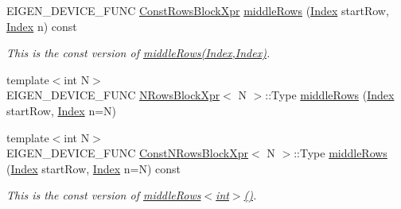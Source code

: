 \begin{DoxyCompactItemize}
\mbox{\label{class_eigen_1_1_sparse_matrix_base_a764c62621c13c3c0334a39f82d46a1fb}} 
E\+I\+G\+E\+N\+\_\+\+D\+E\+V\+I\+C\+E\+\_\+\+F\+U\+NC \mbox{\hyperlink{class_eigen_1_1_block}{Const\+Rows\+Block\+Xpr}} \mbox{\hyperlink{class_eigen_1_1_sparse_matrix_base_a764c62621c13c3c0334a39f82d46a1fb}{middle\+Rows}} (\mbox{\hyperlink{struct_eigen_1_1_eigen_base_a554f30542cc2316add4b1ea0a492ff02}{Index}} start\+Row, \mbox{\hyperlink{struct_eigen_1_1_eigen_base_a554f30542cc2316add4b1ea0a492ff02}{Index}} n) const
\begin{DoxyCompactList}\small\item\em This is the const version of \mbox{\hyperlink{class_eigen_1_1_sparse_matrix_base_aa06954a6c3a27447c4a401f1bfc0fc3a}{middle\+Rows(\+Index,\+Index)}}. \end{DoxyCompactList}\item 
{\footnotesize template$<$int N$>$ }\\E\+I\+G\+E\+N\+\_\+\+D\+E\+V\+I\+C\+E\+\_\+\+F\+U\+NC \mbox{\hyperlink{struct_eigen_1_1_sparse_matrix_base_1_1_n_rows_block_xpr}{N\+Rows\+Block\+Xpr}}$<$ N $>$\+::Type \mbox{\hyperlink{class_eigen_1_1_sparse_matrix_base_a8f5970f79bfb2f270e29a0669c3e8493}{middle\+Rows}} (\mbox{\hyperlink{struct_eigen_1_1_eigen_base_a554f30542cc2316add4b1ea0a492ff02}{Index}} start\+Row, \mbox{\hyperlink{struct_eigen_1_1_eigen_base_a554f30542cc2316add4b1ea0a492ff02}{Index}} n=N)
\item 
\mbox{\label{class_eigen_1_1_sparse_matrix_base_a307edd2f29a77a5e642eac694d0167d1}} 
{\footnotesize template$<$int N$>$ }\\E\+I\+G\+E\+N\+\_\+\+D\+E\+V\+I\+C\+E\+\_\+\+F\+U\+NC \mbox{\hyperlink{struct_eigen_1_1_sparse_matrix_base_1_1_const_n_rows_block_xpr}{Const\+N\+Rows\+Block\+Xpr}}$<$ N $>$\+::Type \mbox{\hyperlink{class_eigen_1_1_sparse_matrix_base_a307edd2f29a77a5e642eac694d0167d1}{middle\+Rows}} (\mbox{\hyperlink{struct_eigen_1_1_eigen_base_a554f30542cc2316add4b1ea0a492ff02}{Index}} start\+Row, \mbox{\hyperlink{struct_eigen_1_1_eigen_base_a554f30542cc2316add4b1ea0a492ff02}{Index}} n=N) const
\begin{DoxyCompactList}\small\item\em This is the const version of \mbox{\hyperlink{class_eigen_1_1_sparse_matrix_base_aa06954a6c3a27447c4a401f1bfc0fc3a}{middle\+Rows$<$int$>$()}}. \end{DoxyCompactList}\item 

\end{DoxyCompactItemize}
